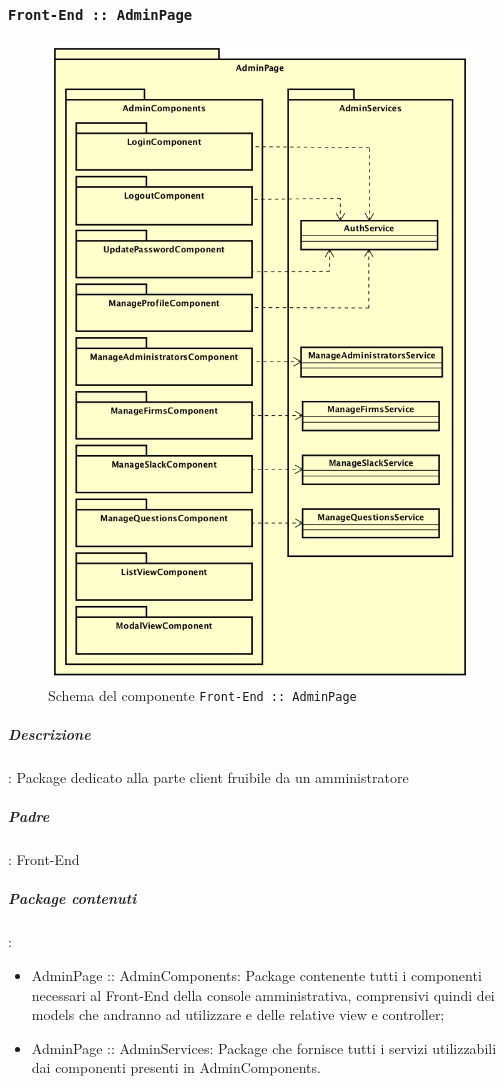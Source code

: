 \documentclass[../DefinizioneDiProdotto_v2.0.0.tex]{subfiles}
\begin{document}
	\newpage
	\subsubsection{\texttt{Front-End :: AdminPage}}
	\begin{figure}[!h]
		\centering
		\includegraphics[scale=0.3]{Architettura/Front-End/AdminPage/AdminPage.png}
		\caption{Schema del componente \texttt{Front-End :: AdminPage}}
	\end{figure}
			\subparagraph{Descrizione}: Package dedicato alla parte client fruibile da un amministratore
			\subparagraph{Padre}: Front-End
			\subparagraph{Package contenuti}:
			\begin{itemize}
				\item AdminPage :: AdminComponents: Package contenente tutti i componenti necessari al Front-End della console amministrativa, comprensivi quindi dei models che andranno ad utilizzare e delle relative view e controller;
				\item AdminPage :: AdminServices: Package che fornisce tutti i servizi utilizzabili dai componenti presenti in AdminComponents.
			\end{itemize}
\end{document}
